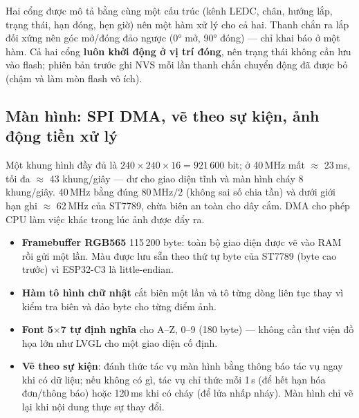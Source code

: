 Hai cổng được mô tả bằng cùng một cấu trúc (kênh LEDC, chân, hướng lắp, trạng thái,
hạn đóng, hẹn giờ) nên một hàm xử lý cho cả hai. Thanh chắn ra lắp đối xứng nên góc
mở/đóng đảo ngược (0° mở, 90° đóng) — chỉ khai báo ở một hàm. Cả hai cổng \textbf{luôn
khởi động ở vị trí đóng}, nên trạng thái không cần lưu vào flash; phiên bản trước ghi
NVS mỗi lần thanh chắn chuyển động đã được bỏ (chậm và làm mòn flash vô ích).

\subsection{Màn hình: SPI DMA, vẽ theo sự kiện, ảnh động tiền xử lý}
\begin{lydo}
Một khung hình đầy đủ là $240\times240\times16 = 921\,600$ bit; ở 40\,MHz mất
$\approx$ 23\,ms, tối đa $\approx$ 43 khung/giây — dư cho giao diện tĩnh và màn hình cháy
8 khung/giây. 40\,MHz bằng đúng $80\,\text{MHz}/2$ (không sai số chia tần) và dưới giới
hạn ghi $\approx$ 62\,MHz của ST7789, chừa biên an toàn cho dây cắm. DMA cho phép CPU
làm việc khác trong lúc ảnh được đẩy ra.
\end{lydo}

\begin{itemize}
\item \textbf{Framebuffer RGB565} 115\,200 byte: toàn bộ giao diện được vẽ vào RAM rồi gửi
  một lần. Màu được lưu sẵn theo thứ tự byte của ST7789 (byte cao trước) vì
  ESP32-C3 là little-endian.
\item \textbf{Hàm tô hình chữ nhật} cắt biên một lần và tô từng dòng liên tục thay vì
  kiểm tra biên và đảo byte cho từng điểm ảnh.
\item \textbf{Font 5$\times$7 tự định nghĩa} cho A–Z, 0–9 (180 byte) — không cần thư viện
  đồ họa lớn như LVGL cho một giao diện cố định.
\item \textbf{Vẽ theo sự kiện}:  đánh thức tác vụ màn hình bằng thông
  báo tác vụ ngay khi có dữ liệu; nếu không có gì, tác vụ chỉ thức mỗi 1\,s (để hết hạn
  hóa đơn/thông báo) hoặc 120\,ms khi có cháy (để lửa nhấp nháy). Màn hình chỉ vẽ lại
  khi nội dung thực sự thay đổi.
\end{itemize}

